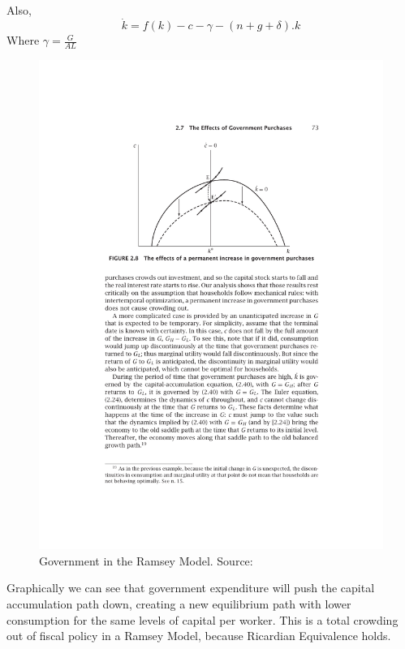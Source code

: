 \paragraph{}
Also,
\begin{equation*}
    \dot{k}=f(k)-c-\gamma-(n+g+\delta).k
\end{equation*}
Where $\gamma=\frac{G}{AL}$

\begin{figure}[H]
    \centering
    \includegraphics[max width=\linewidth]{1_0_Growth_Theory/RamseyGov.pdf}
    \caption{Government in the Ramsey Model. Source: \textcite{romer_advanced_2012}}  
\end{figure}


Graphically we can see that government expenditure will push the capital accumulation path down, creating a new equilibrium path with lower consumption for the same levels of capital per worker. This is a total crowding out of fiscal policy in a Ramsey Model, because Ricardian Equivalence holds.

